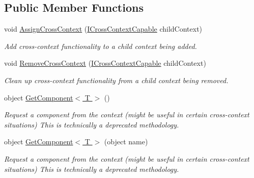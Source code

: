 \subsection*{Public Member Functions}
\begin{DoxyCompactItemize}
\item 
\hypertarget{interfacestrange_1_1extensions_1_1context_1_1api_1_1_i_cross_context_capable_abdc8d8c8eba09f90cec414f9a3fb4af4}{void \hyperlink{interfacestrange_1_1extensions_1_1context_1_1api_1_1_i_cross_context_capable_abdc8d8c8eba09f90cec414f9a3fb4af4}{Assign\-Cross\-Context} (\hyperlink{interfacestrange_1_1extensions_1_1context_1_1api_1_1_i_cross_context_capable}{I\-Cross\-Context\-Capable} child\-Context)}\label{interfacestrange_1_1extensions_1_1context_1_1api_1_1_i_cross_context_capable_abdc8d8c8eba09f90cec414f9a3fb4af4}

\begin{DoxyCompactList}\small\item\em Add cross-\/context functionality to a child context being added. \end{DoxyCompactList}\item 
\hypertarget{interfacestrange_1_1extensions_1_1context_1_1api_1_1_i_cross_context_capable_a79d2c03da24ad3457b758a56623e3b22}{void \hyperlink{interfacestrange_1_1extensions_1_1context_1_1api_1_1_i_cross_context_capable_a79d2c03da24ad3457b758a56623e3b22}{Remove\-Cross\-Context} (\hyperlink{interfacestrange_1_1extensions_1_1context_1_1api_1_1_i_cross_context_capable}{I\-Cross\-Context\-Capable} child\-Context)}\label{interfacestrange_1_1extensions_1_1context_1_1api_1_1_i_cross_context_capable_a79d2c03da24ad3457b758a56623e3b22}

\begin{DoxyCompactList}\small\item\em Clean up cross-\/context functionality from a child context being removed. \end{DoxyCompactList}\item 
object \hyperlink{interfacestrange_1_1extensions_1_1context_1_1api_1_1_i_cross_context_capable_ad598d53c2eed0d24fbf0db37e4cafe88}{Get\-Component$<$ T $>$} ()
\begin{DoxyCompactList}\small\item\em Request a component from the context (might be useful in certain cross-\/context situations) This is technically a deprecated methodology. \end{DoxyCompactList}\item 
object \hyperlink{interfacestrange_1_1extensions_1_1context_1_1api_1_1_i_cross_context_capable_a06a45c44b9bcc05f592d9262bfff146d}{Get\-Component$<$ T $>$} (object name)
\begin{DoxyCompactList}\small\item\em Request a component from the context (might be useful in certain cross-\/context situations) This is technically a deprecated methodology. \end{DoxyCompactList}\end{DoxyCompactItemize}
